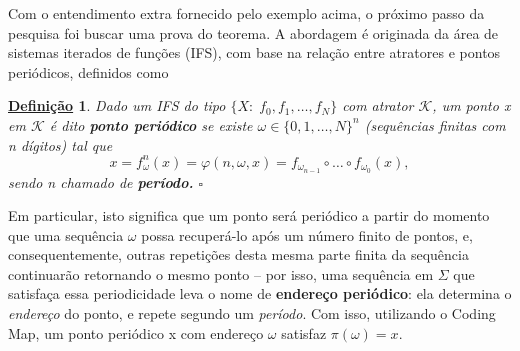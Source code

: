 \documentclass[12pt]{article}
\newtheorem*{def*}{\underline{Definição}}
\theoremstyle{definition}
\begin{document}
Com o entendimento extra fornecido pelo exemplo acima, o próximo passo da pesquisa foi buscar uma prova do teorema. A abordagem é originada da área de sistemas iterados de funções (IFS), com base na relação entre atratores e pontos periódicos, definidos como
\begin{def*}
	Dado um IFS do tipo \(\{X:\; f_0, f_1,\dotsc , f_{N}\}\) com atrator \(\mathcal{K}\), um ponto x em \(\mathcal{K}\) é dito \textbf{ponto periódico} se existe \(\omega \in \{0,1, \dotsc , N\}^{n}\) (sequências finitas com n dígitos) tal que
	\[
		x = f_{\omega }^{n}(x) = \varphi (n, \omega , x) = f_{\omega_{n-1}}\circ \dotsc \circ f_{\omega_{0}}(x),
	\]
	sendo n chamado de \textbf{período.} \(\square\)
\end{def*}
Em particular, isto significa que um ponto será periódico a partir do momento que uma sequência \(\omega \) possa recuperá-lo após um número finito de pontos, e, consequentemente, outras repetições desta mesma parte finita da sequência continuarão retornando o mesmo ponto -- por isso, uma sequência em \(\Sigma \) que satisfaça essa periodicidade leva o nome de \textbf{endereço periódico}: ela determina o \textit{endereço} do ponto, e repete segundo um \textit{período}. Com isso, utilizando o Coding Map, um ponto periódico x com endereço \(\omega \) satisfaz \(\pi (\omega ) = x.\)
\end{document}
